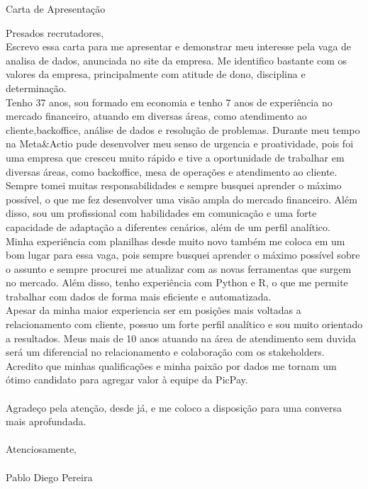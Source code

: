 \documentclass{resume}
\begin{document}
\begin{rSection}{Carta de Apresentação}
{
    Presados recrutadores,
    \vspace{0.5em}\\
    Escrevo essa carta para me apresentar e demonstrar meu interesse pela vaga de analisa de dados, anunciada no site da empresa. Me 
    identifico bastante com os valores da empresa, principalmente com atitude de dono, disciplina e determinação.\vspace{0.5em}\\
    
    Tenho 37 anos, sou formado em economia e tenho 7 anos de experiência no mercado financeiro, atuando em diversas áreas, como atendimento 
    ao cliente,backoffice, análise de dados e resolução de problemas. Durante meu tempo na Meta\&Actio pude desenvolver meu senso de urgencia 
    e proatividade, pois foi uma empresa que cresceu muito rápido e tive a oportunidade de trabalhar em diversas áreas, como backoffice, mesa 
    de operações e atendimento ao cliente. Sempre tomei muitas responsabilidades e sempre busquei aprender o máximo possível, o que me fez 
    desenvolver uma visão ampla do mercado financeiro. Além disso, sou um profissional com habilidades em comunicação e uma forte capacidade 
    de adaptação a diferentes cenários, além de um perfil analítico.\vspace{0.5em}\\

     Minha experiência com planilhas desde muito novo também me coloca em um bom lugar para essa vaga, pois sempre busquei aprender o máximo 
     possível sobre o assunto e sempre procurei me atualizar com as novas ferramentas que surgem no mercado. Além disso, tenho experiência com 
     Python e R, o que me permite trabalhar com dados de forma mais eficiente e automatizada.\vspace{0.5em}\\
     
     Apesar da minha maior experiencia ser em posições mais voltadas a relacionamento com cliente, possuo um forte perfil analítico e sou muito 
     orientado a resultados. Meus mais de 10 anos atuando na área de atendimento sem duvida será um diferencial no relacionamento e colaboração 
     com os stakeholders.\vspace{0.5em}\\
    
    Acredito que minhas qualificações e minha paixão por dados me tornam um ótimo candidato para agregar valor à equipe da PicPay.\vspace{0.5em}\\ \\

    Agradeço pela atenção, desde já, e me coloco a disposição para uma conversa mais aprofundada.\vspace{0.5em}\\  \\  

    Atenciosamente,\vspace{0.5em}\\ \\
    Pablo Diego Pereira

}
\end{rSection}
\end{document}
